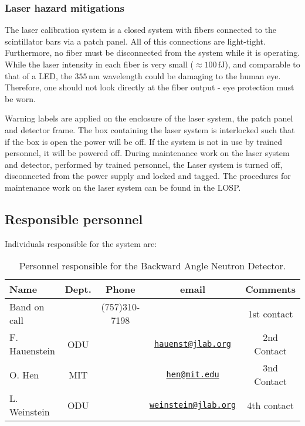 \subsubsection{Laser hazard mitigations}
The laser calibration system is a closed system with fibers connected to the scintillator bars via a patch panel. All of this connections are light-tight. Furthermore, no fiber must be disconnected from the system while it is operating. While the laser intensity in each fiber is very small ($\approx 100\,\mathrm{fJ}$), and comparable to that of a LED, the $355\,\mathrm{nm}$ wavelength could be damaging to the human eye. Therefore, one should not look directly at the fiber output - eye protection must be worn. 

Warning labels are applied on the enclosure of the laser system, the patch panel and detector frame. The box containing the laser system is interlocked such that if the box is open the power will be off. If the system is not in use by trained personnel, it will be powered off. During maintenance work on the laser system and detector, performed by trained personnel, the Laser system is turned off, disconnected from the power supply and locked and tagged. The procedures for maintenance work on the laser system can be found in the LOSP.


\subsection{Responsible personnel}
\indent

Individuals responsible for the system are:

\begin{table}[!htb]
 \centering
 \begin{tabular}{|l|c|c|c|c|}
\hline
 Name                 & Dept.     & Phone                             & email                                                                                                    & Comments \\ \hline
 Band on call      &               &     (757)310-7198            &                                                                                                              & 1st contact \\ \hline
 F.  Hauenstein   & ODU        &                                        & \href{mailto:hauenst@jlab.org}{\nolinkurl{hauenst@jlab.org}}            & 2nd Contact \\ \hline
  O. Hen               & MIT        &                                        & \href{mailto:hen@mit.edu}{\nolinkurl{hen@mit.edu}}                          & 3nd Contact \\ \hline
 L. Weinstein      & ODU      &                                        & \href{mailto:weinstein@jlab.org}{\nolinkurl{weinstein@jlab.org}}          & 4th contact  \\ \hline

 \end{tabular}
\caption{Personnel responsible for the Backward Angle Neutron Detector.} 
\label{tb:band}
\end{table}
